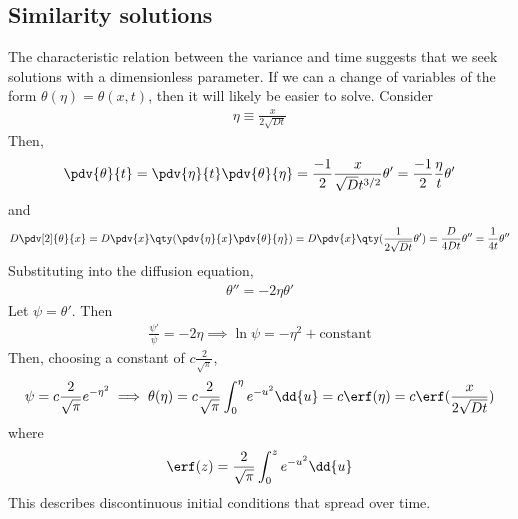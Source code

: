 \subsection{Similarity solutions}
The characteristic relation between the variance and time suggests that we seek solutions with a dimensionless parameter.
If we can a change of variables of the form $\theta(\eta) = \theta(x,t)$, then it will likely be easier to solve.
Consider
\begin{align*}
	\eta \equiv \frac{x}{2\sqrt{Dt}}
\end{align*}
Then,
\begin{align*}
	\pdv{\theta}{t} = \pdv{\eta}{t} \pdv{\theta}{\eta} = \frac{-1}{2} \frac{x}{\sqrt{D} t^{3/2}} \theta' = \frac{-1}{2} \frac{\eta}{t} \theta'
\end{align*}
and
\begin{align*}
	D \pdv[2]{\theta}{x} = D \pdv{x} \qty(\pdv{\eta}{x} \pdv{\theta}{\eta}) = D \pdv{x} \qty(\frac{1}{2\sqrt{Dt}} \theta') = \frac{D}{4Dt} \theta'' = \frac{1}{4t} \theta''
\end{align*}
Substituting into the diffusion equation,
\begin{align*}
	\theta'' = -2 \eta \theta'
\end{align*}
Let $\psi = \theta'$.
Then
\begin{align*}
	\frac{\psi'}{\psi} = -2\eta \implies \ln \psi = -\eta^2 + \text{constant}
\end{align*}
Then, choosing a constant of $c\frac{2}{\sqrt{\pi}}$,
\begin{align*}
	\psi = c\frac{2}{\sqrt{\pi}} e^{-\eta^2} \implies \theta(\eta) = c\frac{2}{\sqrt{\pi}} \int_0^\eta e^{-u^2} \dd{u} = c \erf(\eta) = c \erf(\frac{x}{2\sqrt{Dt}})
\end{align*}
where
\begin{align*}
	\erf(z) = \frac{2}{\sqrt{\pi}} \int_0^z e^{-u^2} \dd{u}
\end{align*}
This describes discontinuous initial conditions that spread over time.

